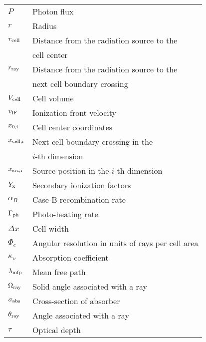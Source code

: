 \begin{table}
\begin{tabular}{ll}
$P$ & Photon flux \\
$r$ & Radius \\
$r_{\rm cell}$ & Distance from the radiation source to the \\
& cell center\\
$r_{\rm ray}$ & Distance from the radiation source to the \\
& next cell boundary crossing \\
$V_{\rm cell}$ & Cell volume \\
$v_{\rm IF}$ & Ionization front velocity \\
$x_{\rm 0,i}$ & Cell center coordinates \\
$x_{\rm cell,i}$ & Next cell boundary crossing in the \\
& $i$-th dimension\\
$x_{\rm src,i}$ & Source position in the $i$-th dimension \\
$Y_{\rm x}$ & Secondary ionization factors \\
$\alpha_B$ & Case-B recombination rate \\
$\Gamma_{\rm ph}$ & Photo-heating rate \\
$\Delta x$ & Cell width \\
$\Phi_c$ & Angular resolution in units of rays per cell area \\
$\kappa_\nu$ & Absorption coefficient \\
$\lambda_{\rm mfp}$ & Mean free path \\
$\Omega_{\rm ray}$ & Solid angle associated with a ray \\
$\sigma_{\rm abs}$ & Cross-section of absorber \\
$\theta_{\rm ray}$ & Angle associated with a ray \\
$\tau$ & Optical depth \\
\hline
\end{tabular}
\end{table}
